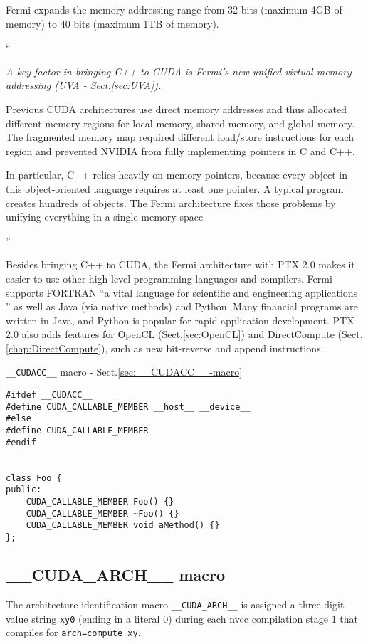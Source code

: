 \begin{mdframed}

Fermi expands the memory-addressing range from 32 bits (maximum
4GB of memory) to 40 bits (maximum 1TB of memory).

``{\it A key factor in bringing C++ to CUDA is Fermi's new unified virtual
  memory addressing (UVA - Sect.\ref{sec:UVA}). 
  
  Previous CUDA architectures use direct memory addresses and thus allocated
  different memory regions for local memory, shared memory, and global memory.
  The fragmented memory map required different load/store instructions for each
  region and prevented NVIDIA from fully implementing pointers in C and C++. 
  
  In particular, C++ relies heavily on memory pointers, because every object in
  this object-oriented language requires at least one pointer.  A typical
  program creates hundreds of objects.
  The Fermi architecture fixes those problems by unifying everything in a single
  memory space} ''


Besides bringing C++ to CUDA, the Fermi architecture with PTX 2.0 makes it
easier to use other high level programming languages and compilers. Fermi
supports FORTRAN  ``a vital language for scientific and engineering applications
'' as well as Java (via native methods) and Python. Many financial programs are
written in Java, and Python is popular for rapid application development. PTX
2.0 also adds features for OpenCL (Sect.\ref{sec:OpenCL}) and DirectCompute
(Sect.\ref{chap:DirectCompute}), such as new bit-reverse and append
instructions.
\end{mdframed}

\verb!__CUDACC__! macro - Sect.\ref{sec:__CUDACC__-macro}
\begin{verbatim}
#ifdef __CUDACC__
#define CUDA_CALLABLE_MEMBER __host__ __device__
#else
#define CUDA_CALLABLE_MEMBER
#endif 


class Foo {
public:
    CUDA_CALLABLE_MEMBER Foo() {}
    CUDA_CALLABLE_MEMBER ~Foo() {}
    CUDA_CALLABLE_MEMBER void aMethod() {}
};
\end{verbatim}




\subsection{\_\_CUDA\_ARCH\_\_ macro}
\label{sec:__CUDA_ARCH__}

The architecture identification macro \verb!__CUDA_ARCH__! is assigned a
three-digit value string \verb!xy0! (ending in a literal 0) during each nvcc
compilation stage 1 that compiles for \verb!arch=compute_xy!.

